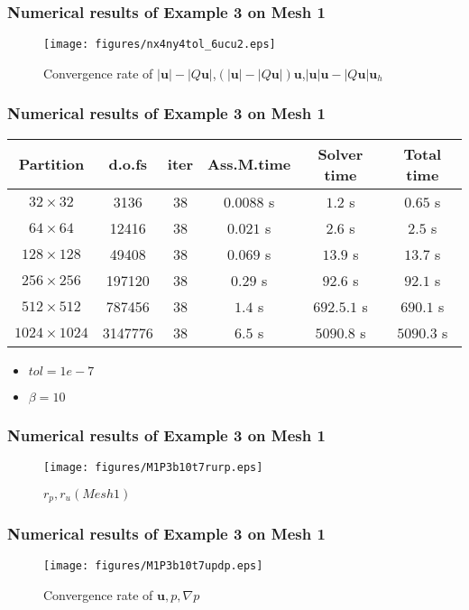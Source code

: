 \documentclass[notheorems,serif]{beamer}
\begin{document}
\begin{frame}
\frametitle{Numerical results of Example 3 on Mesh 1}
\begin{figure}[H] 
\centering 
\texttt{[image: figures/nx4ny4tol\_6ucu2.eps]} 
\caption{Convergence rate of $\left|\boldsymbol{u}\right|-\left|Q\boldsymbol{u}\right|$,$(\left|\boldsymbol{u}\right|-\left|Q\boldsymbol{u}\right|)\boldsymbol{u}$,$\left|\boldsymbol{u}\right|\boldsymbol{u}-\left|Q\boldsymbol{u}\right|\boldsymbol{u}_h$}
\label{fig:normumesh1p3} 
\end{figure}
\end{frame}

\begin{frame}
\frametitle{Numerical results of Example 3 on Mesh 1}
\begin{tabular}{ |c|c|c|c|c|c| }   
\hline   
Partition & d.o.fs & iter & Ass.M.time & Solver time & Total time \\
\hline
$32\times 32$ & 3136 & 38 & $0.0088$ s & $1.2$ s & $0.65$ s \\
$64\times 64$ & 12416 & 38 & $0.021$ s & $2.6$ s & $2.5$ s \\
$128\times 128$ & 49408 & 38 & $0.069$ s & $13.9$ s & $13.7$ s \\
$256\times 256$ & 197120 & 38 & $0.29$ s & $92.6$ s & $92.1$ s \\
$512\times 512$ & 787456 & 38 & $1.4$ s & $692.5.1$ s & $690.1$ s \\
$1024\times 1024$ & 3147776 & 38 & $6.5$ s & $5090.8$ s & $5090.3$ s \\
\hline 
\end{tabular}
\smallskip
\begin{itemize}
\item $tol = 1e-7$
\item $\beta = 10$
\end{itemize}
\end{frame}

\begin{frame}
\frametitle{Numerical results of Example 3 on Mesh 1}
\begin{figure}[H] 
\centering 
\texttt{[image: figures/M1P3b10t7rurp.eps]} 
\caption{$r_p, r_u(Mesh 1)$}
\label{fig:rpmesh1p3}
\end{figure}
\end{frame}

\begin{frame}
\frametitle{Numerical results of Example 3 on Mesh 1}
\begin{figure}[H] 
\centering 
\texttt{[image: figures/M1P3b10t7updp.eps]} 
\caption{Convergence rate of $\boldsymbol{u}, p, \nabla p$}
\label{fig:upmesh1p3} 
\end{figure}
\end{frame}
\end{document}
